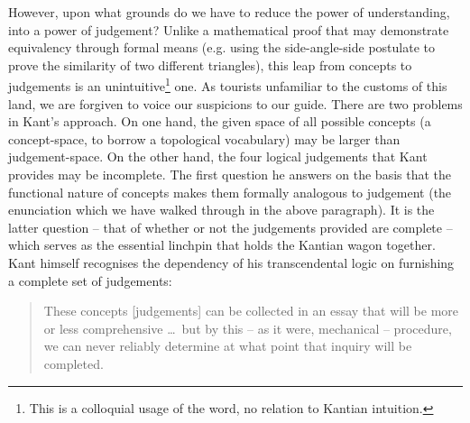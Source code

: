 

However, upon what grounds do we have to reduce the power of understanding, into a power of judgement? Unlike a mathematical proof that may demonstrate equivalency through formal means (e.g. using the side-angle-side postulate to prove the similarity of two different triangles), this leap from concepts to judgements is an unintuitive\footnote{This is a colloquial usage of the word, no relation to Kantian intuition.} one. As tourists unfamiliar to the customs of this land, we are forgiven to voice our suspicions to our guide. There are two problems in Kant's approach. On one hand, the given space of all possible concepts (a concept-space, to borrow a topological vocabulary) may be larger than judgement-space. On the other hand, the four logical judgements that Kant provides may be incomplete. The first question he answers on the basis that the functional nature of concepts makes them formally analogous to judgement (the enunciation which we have walked through in the above paragraph). It is the latter question -- that of whether or not the judgements provided are complete -- which serves as the essential linchpin that holds the Kantian wagon together. Kant himself recognises the dependency of his transcendental logic on furnishing a complete set of judgements:

\begin{quote}
  These concepts [judgements] can be collected in an essay that will be more or less comprehensive \ldots\ but by this -- as it were, mechanical -- procedure, we can never reliably determine at what point that inquiry will be completed.

  \autocite[B92]{hackett}
\end{quote}

